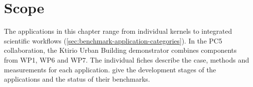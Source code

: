 \section{Scope}
\label{sec:apps-intro}

The applications in this chapter range from individual kernels to
integrated scientific workflows (\cref{sec:benchmark-application-categories}).
In the PC5 collaboration, the Ktirio Urban Building demonstrator
combines components from WP1, WP6 and WP7. The individual fiches
describe the case, methods and measurements for each application.
 give the
development stages of the applications and the status of their benchmarks.
